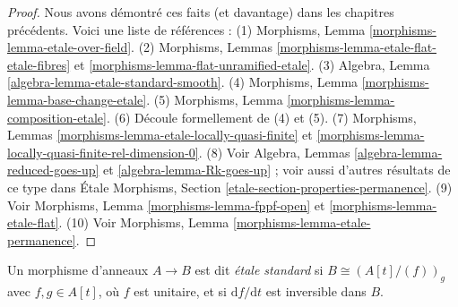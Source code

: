 \begin{proof}
Nous avons d\'emontr\'e ces faits (et davantage) dans les chapitres pr\'ec\'edents.
Voici une liste de r\'ef\'erences :
(1) Morphisms, Lemma \ref{morphisms-lemma-etale-over-field}.
(2) Morphisms, Lemmas \ref{morphisms-lemma-etale-flat-etale-fibres}
et \ref{morphisms-lemma-flat-unramified-etale}.
(3) Algebra, Lemma \ref{algebra-lemma-etale-standard-smooth}.
(4) Morphisms, Lemma \ref{morphisms-lemma-base-change-etale}.
(5) Morphisms, Lemma \ref{morphisms-lemma-composition-etale}.
(6) D\'ecoule formellement de (4) et (5).
(7) Morphisms, Lemmas \ref{morphisms-lemma-etale-locally-quasi-finite}
et \ref{morphisms-lemma-locally-quasi-finite-rel-dimension-0}.
(8) Voir Algebra, Lemmas \ref{algebra-lemma-reduced-goes-up} et
\ref{algebra-lemma-Rk-goes-up} ; voir aussi d'autres r\'esultats de ce type
dans \'Etale Morphisms, Section \ref{etale-section-properties-permanence}.
(9) Voir Morphisms, Lemma \ref{morphisms-lemma-fppf-open} et
\ref{morphisms-lemma-etale-flat}.
(10) Voir Morphisms, Lemma \ref{morphisms-lemma-etale-permanence}.
\end{proof}

\begin{definition}
\label{definition-standard-etale}
Un morphisme d'anneaux $A \to B$ est dit {\it \'etale standard} si
$B \cong \left(A[t]/(f)\right)_g$ avec $f, g \in A[t]$, o\`u $f$ est unitaire,
et si $\text{d}f/\text{d}t$ est inversible dans $B$.
\end{definition}

